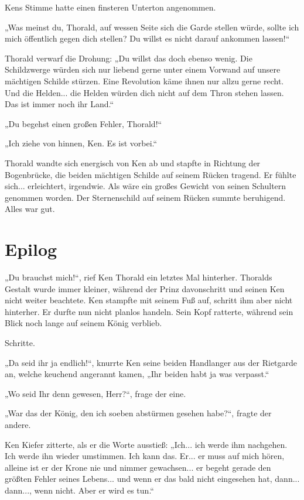 Kens Stimme hatte einen finsteren Unterton angenommen.

„Was meinst du, Thorald, auf wessen Seite sich die Garde stellen würde, sollte ich mich öffentlich gegen dich stellen? Du willst es nicht darauf ankommen lassen!“

Thorald verwarf die Drohung: „Du willst das doch ebenso wenig. Die Schildzwerge würden sich nur liebend gerne unter einem Vorwand auf unsere mächtigen Schilde stürzen. Eine Revolution käme ihnen nur allzu gerne recht. Und die Helden... die Helden würden dich nicht auf dem Thron stehen lassen. Das ist immer noch ihr Land.“

„Du begehst einen großen Fehler, Thorald!“

„Ich ziehe von hinnen, Ken. Es ist vorbei.“

Thorald wandte sich energisch von Ken ab und stapfte in Richtung der Bogenbrücke, die beiden mächtigen Schilde auf seinem Rücken tragend. Er fühlte sich... erleichtert, irgendwie. Als wäre ein großes Gewicht von seinen Schultern genommen worden. Der Sternenschild auf seinem Rücken summte beruhigend. Alles war gut.








\newpage
\section{Epilog}

„Du brauchst mich!“, rief Ken Thorald ein letztes Mal hinterher. Thoralds Gestalt wurde immer kleiner, während der Prinz davonschritt und seinen Ken nicht weiter beachtete. Ken stampfte mit seinem Fuß auf, schritt ihm aber nicht hinterher. Er durfte nun nicht planlos handeln. Sein Kopf ratterte, während sein Blick noch lange auf seinem König verblieb.

Schritte.

„Da seid ihr ja endlich!“, knurrte Ken seine beiden Handlanger aus der Rietgarde an, welche keuchend angerannt kamen, „Ihr beiden habt ja was verpasst.“

„Wo seid Ihr denn gewesen, Herr?“, frage der eine.

„War das der König, den ich soeben abstürmen gesehen habe?“, fragte der andere.

Ken Kiefer zitterte, als er die Worte ausstieß: „Ich... ich werde ihm nachgehen. Ich werde ihn wieder umstimmen. Ich kann das. Er... er muss auf mich hören, alleine ist er der Krone nie und nimmer gewachsen... er begeht gerade den größten Fehler seines Lebens... und wenn er das bald nicht eingesehen hat, dann... dann..., wenn nicht. Aber er wird es tun.“

